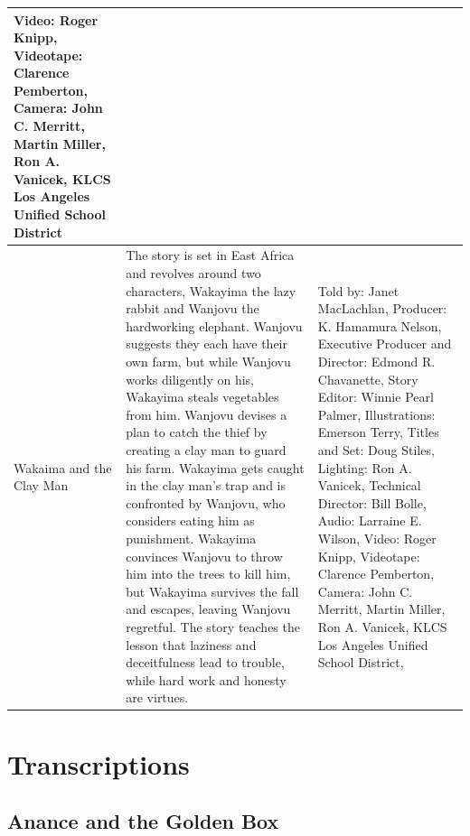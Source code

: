 \begin{table}[h]
\begin{small}
\begin{tabular}{|p{1.5cm}|p{8.5cm}|p{7cm}|}
            Video: Roger Knipp,
            Videotape: Clarence Pemberton,
            Camera: John C. Merritt, Martin Miller, Ron A. Vanicek,
            KLCS Los Angeles Unified School District
            \\
            \hline
            Wakaima and the Clay Man
                                 &
            The story is set in East Africa and revolves around two characters, Wakayima the lazy rabbit and Wanjovu the hardworking elephant.
            Wanjovu suggests they each have their own farm, but while Wanjovu works diligently on his, Wakayima steals vegetables from him.
            Wanjovu devises a plan to catch the thief by creating a clay man to guard his farm.
            Wakayima gets caught in the clay man's trap and is confronted by Wanjovu, who considers eating him as punishment.
            Wakayima convinces Wanjovu to throw him into the trees to kill him, but Wakayima survives the fall and escapes, leaving Wanjovu regretful.
            The story teaches the lesson that laziness and deceitfulness lead to trouble, while hard work and honesty are virtues.
                                 &
            Told by: Janet MacLachlan,
            Producer: K. Hamamura Nelson,
            Executive Producer and Director: Edmond R. Chavanette,
            Story Editor: Winnie Pearl Palmer,
            Illustrations: Emerson Terry,
            Titles and Set: Doug Stiles,
            Lighting: Ron A. Vanicek,
            Technical Director: Bill Bolle,
            Audio: Larraine E. Wilson,
            Video: Roger Knipp,
            Videotape: Clarence Pemberton,
            Camera: John C. Merritt, Martin Miller, Ron A. Vanicek,
            KLCS Los Angeles Unified School District,
            \\
            \hline
        \end{tabular}
    \end{small}

\end{table}

\clearpage
\newpage

\section{Transcriptions}

\subsection{Anance and the Golden Box}

